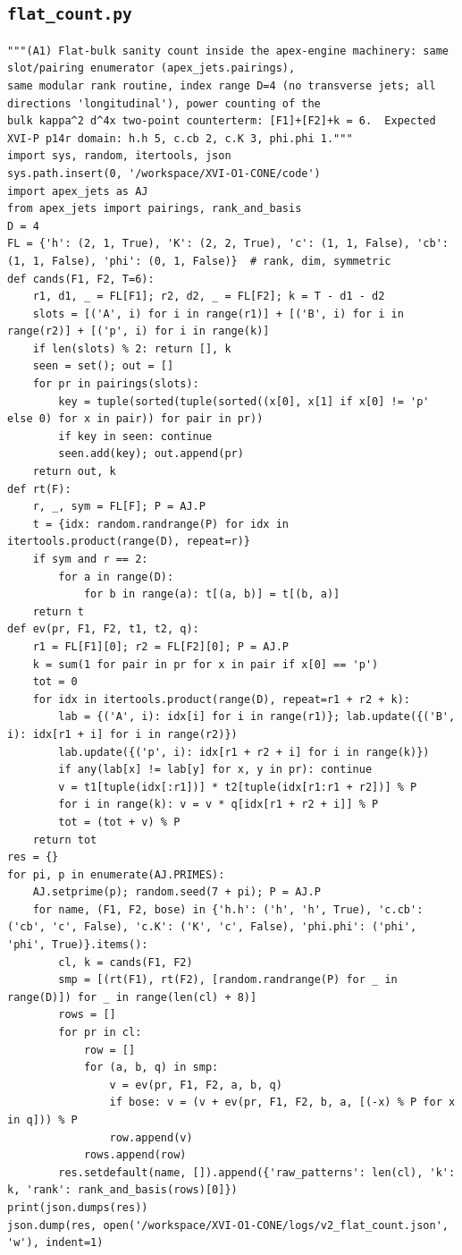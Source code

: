 \documentclass[10pt]{article}
\begin{document}
\subsection{\texttt{flat\_count.py}}
\begin{lstlisting}
"""(A1) Flat-bulk sanity count inside the apex-engine machinery: same slot/pairing enumerator (apex_jets.pairings),
same modular rank routine, index range D=4 (no transverse jets; all directions 'longitudinal'), power counting of the
bulk kappa^2 d^4x two-point counterterm: [F1]+[F2]+k = 6.  Expected XVI-P p14r domain: h.h 5, c.cb 2, c.K 3, phi.phi 1."""
import sys, random, itertools, json
sys.path.insert(0, '/workspace/XVI-O1-CONE/code')
import apex_jets as AJ
from apex_jets import pairings, rank_and_basis
D = 4
FL = {'h': (2, 1, True), 'K': (2, 2, True), 'c': (1, 1, False), 'cb': (1, 1, False), 'phi': (0, 1, False)}  # rank, dim, symmetric
def cands(F1, F2, T=6):
    r1, d1, _ = FL[F1]; r2, d2, _ = FL[F2]; k = T - d1 - d2
    slots = [('A', i) for i in range(r1)] + [('B', i) for i in range(r2)] + [('p', i) for i in range(k)]
    if len(slots) % 2: return [], k
    seen = set(); out = []
    for pr in pairings(slots):
        key = tuple(sorted(tuple(sorted((x[0], x[1] if x[0] != 'p' else 0) for x in pair)) for pair in pr))
        if key in seen: continue
        seen.add(key); out.append(pr)
    return out, k
def rt(F):
    r, _, sym = FL[F]; P = AJ.P
    t = {idx: random.randrange(P) for idx in itertools.product(range(D), repeat=r)}
    if sym and r == 2:
        for a in range(D):
            for b in range(a): t[(a, b)] = t[(b, a)]
    return t
def ev(pr, F1, F2, t1, t2, q):
    r1 = FL[F1][0]; r2 = FL[F2][0]; P = AJ.P
    k = sum(1 for pair in pr for x in pair if x[0] == 'p')
    tot = 0
    for idx in itertools.product(range(D), repeat=r1 + r2 + k):
        lab = {('A', i): idx[i] for i in range(r1)}; lab.update({('B', i): idx[r1 + i] for i in range(r2)})
        lab.update({('p', i): idx[r1 + r2 + i] for i in range(k)})
        if any(lab[x] != lab[y] for x, y in pr): continue
        v = t1[tuple(idx[:r1])] * t2[tuple(idx[r1:r1 + r2])] % P
        for i in range(k): v = v * q[idx[r1 + r2 + i]] % P
        tot = (tot + v) % P
    return tot
res = {}
for pi, p in enumerate(AJ.PRIMES):
    AJ.setprime(p); random.seed(7 + pi); P = AJ.P
    for name, (F1, F2, bose) in {'h.h': ('h', 'h', True), 'c.cb': ('cb', 'c', False), 'c.K': ('K', 'c', False), 'phi.phi': ('phi', 'phi', True)}.items():
        cl, k = cands(F1, F2)
        smp = [(rt(F1), rt(F2), [random.randrange(P) for _ in range(D)]) for _ in range(len(cl) + 8)]
        rows = []
        for pr in cl:
            row = []
            for (a, b, q) in smp:
                v = ev(pr, F1, F2, a, b, q)
                if bose: v = (v + ev(pr, F1, F2, b, a, [(-x) % P for x in q])) % P
                row.append(v)
            rows.append(row)
        res.setdefault(name, []).append({'raw_patterns': len(cl), 'k': k, 'rank': rank_and_basis(rows)[0]})
print(json.dumps(res))
json.dump(res, open('/workspace/XVI-O1-CONE/logs/v2_flat_count.json', 'w'), indent=1)
\end{lstlisting}
\end{document}
